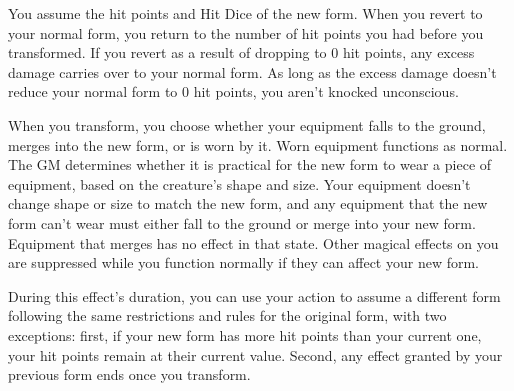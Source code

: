 You assume the hit points and Hit Dice of the new form. When you revert to your normal form, you return to the number of hit points you had before you transformed. If you revert as a result of dropping to 0 hit points, any excess damage carries over to your normal form. As long as the excess damage doesn’t reduce your normal form to 0 hit points, you aren’t knocked unconscious. 

When you transform, you choose whether your equipment falls to the ground, merges into the new form, or is worn by it. Worn equipment functions as normal. The GM determines whether it is practical for the new form to wear a piece of equipment, based on the creature’s shape and size. Your equipment doesn’t change shape or size to match the new form, and any equipment that the new form can’t wear must either fall to the ground or merge into your new form. Equipment that merges has no effect in that state. Other magical effects on you are suppressed while you function normally if they can affect your new form.

During this effect’s duration, you can use your action to assume a different form following the same restrictions and rules for the original form, with two exceptions: first, if your new form has more hit points than your current one, your hit points remain at their current value. Second, any effect granted by your previous form ends once you transform. 










